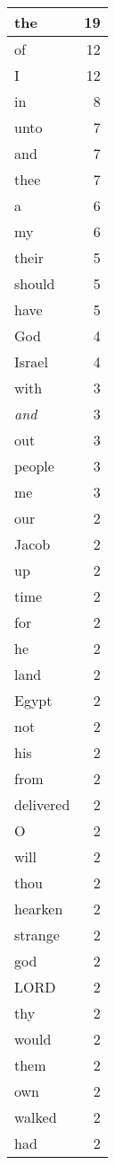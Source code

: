 \begin{center}
\begin{longtable}{l|r}
\hline \hline
\endlastfoot
the & 19 \\ \hline
of & 12 \\ \hline
I & 12 \\ \hline
in & 8 \\ \hline
unto & 7 \\ \hline
and & 7 \\ \hline
thee & 7 \\ \hline
a & 6 \\ \hline
my & 6 \\ \hline
their & 5 \\ \hline
should & 5 \\ \hline
have & 5 \\ \hline
God & 4 \\ \hline
Israel & 4 \\ \hline
with & 3 \\ \hline
\emph{and} & 3 \\ \hline
out & 3 \\ \hline
people & 3 \\ \hline
me & 3 \\ \hline
our & 2 \\ \hline
Jacob & 2 \\ \hline
up & 2 \\ \hline
time & 2 \\ \hline
for & 2 \\ \hline
he & 2 \\ \hline
land & 2 \\ \hline
Egypt & 2 \\ \hline
not & 2 \\ \hline
his & 2 \\ \hline
from & 2 \\ \hline
delivered & 2 \\ \hline
O & 2 \\ \hline
will & 2 \\ \hline
thou & 2 \\ \hline
hearken & 2 \\ \hline
strange & 2 \\ \hline
god & 2 \\ \hline
LORD & 2 \\ \hline
thy & 2 \\ \hline
would & 2 \\ \hline
them & 2 \\ \hline
own & 2 \\ \hline
walked & 2 \\ \hline
had & 2 \\ \hline

\end{longtable}
\end{center}
